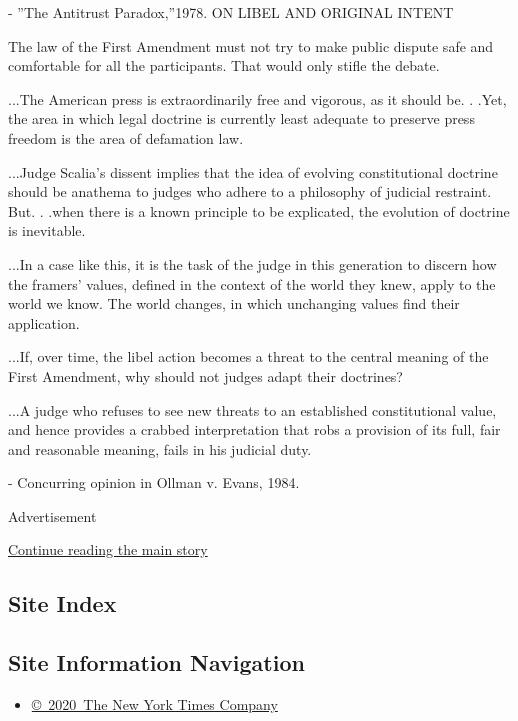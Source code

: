 - ''The Antitrust Paradox,''1978. ON LIBEL AND ORIGINAL INTENT

The law of the First Amendment must not try to make public dispute safe
and comfortable for all the participants. That would only stifle the
debate.

...The American press is extraordinarily free and vigorous, as it should
be. . .Yet, the area in which legal doctrine is currently least adequate
to preserve press freedom is the area of defamation law.

...Judge Scalia's dissent implies that the idea of evolving
constitutional doctrine should be anathema to judges who adhere to a
philosophy of judicial restraint. But. . .when there is a known
principle to be explicated, the evolution of doctrine is inevitable.

...In a case like this, it is the task of the judge in this generation
to discern how the framers' values, defined in the context of the world
they knew, apply to the world we know. The world changes, in which
unchanging values find their application.

...If, over time, the libel action becomes a threat to the central
meaning of the First Amendment, why should not judges adapt their
doctrines?

...A judge who refuses to see new threats to an established
constitutional value, and hence provides a crabbed interpretation that
robs a provision of its full, fair and reasonable meaning, fails in his
judicial duty.

- Concurring opinion in Ollman v. Evans, 1984.

Advertisement

\protect\hyperlink{after-bottom}{Continue reading the main story}

\hypertarget{site-index}{%
\subsection{Site Index}\label{site-index}}

\hypertarget{site-information-navigation}{%
\subsection{Site Information
Navigation}\label{site-information-navigation}}

\begin{itemize}
\tightlist
\item
  \href{https://help.nytimes3xbfgragh.onion/hc/en-us/articles/115014792127-Copyright-notice}{©~2020~The
  New York Times Company}
\end{itemize}

